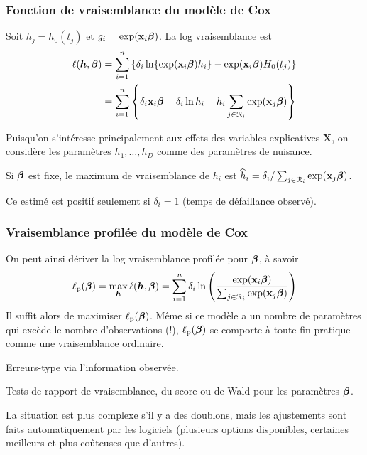 \documentclass{beamer}
\begin{document}
\begin{frame}
 \frametitle{Fonction de vraisemblance du modèle de Cox}
 Soit $h_j = h_0(t_j)$ et $g_i=\exp(\mathbf{x}_i \boldsymbol {\beta})$. La log vraisemblance est
 \begin{align*}
  \ell(\boldsymbol {h}, \boldsymbol {\beta}) &= \sum_{i=1}^n \left\{ \delta_i \ln \{\exp(\mathbf{x}_i \boldsymbol {\beta})h_i\}-\exp(\mathbf{x}_i \boldsymbol {\beta})H_0(t_j)\right\} 
  \\& =  \sum_{i=1}^n \left\{ \delta_i \mathbf{x}_i \boldsymbol {\beta} + \delta_i \ln h_i -h_i \sum_{j \in \mathcal{R}_i}\exp(\mathbf{x}_j \boldsymbol {\beta})\right\} 
 \end{align*}
\bi 
\item Puisqu'on s'intéresse principalement aux effets des variables explicatives $\mathbf{X}$, on considère les paramètres $h_1,\ldots, h_D$ comme des paramètres de nuisance.
\item Si $\boldsymbol {\beta}$ est fixe, le maximum de vraisemblance de $h_i$ est $\widehat{h}_i = \delta_i/\sum_{j \in \mathcal{R}_i} \exp(\mathbf{x}_j \boldsymbol {\beta})$.
\item Ce estimé est positif seulement si $\delta_i=1$ (temps de défaillance observé).
\ei 
\end{frame}
\begin{frame}
 \frametitle{Vraisemblance profilée du modèle de Cox}
 On peut ainsi dériver la log vraisemblance profilée pour $\boldsymbol {\beta}$, à savoir
 \begin{align*}
  \ell_{\mathrm{p}}(\boldsymbol {\beta}) = \max_{\boldsymbol {h}}  \ell(\boldsymbol {h}, \boldsymbol {\beta})  = \sum_{i=1}^n \delta_i \ln \left( \frac{\exp(\mathbf{x}_i\boldsymbol {\beta})}{\sum_{j \in \mathcal{R}_i}\exp(\mathbf{x}_j\boldsymbol {\beta})}\right)
 \end{align*}
 Il suffit alors de maximiser $\ell_{\mathrm{p}}(\boldsymbol {\beta})$. 
Même si ce modèle a un nombre de paramètres qui excède le nombre d'observations (!), $\ell_{\mathrm{p}}(\boldsymbol {\beta})$ se comporte à toute fin pratique comme une vraisemblance ordinaire. 
 \bi \item Erreurs-type via l'information observée.
 \item Tests de rapport de vraisemblance, du score ou de Wald pour les paramètres $\boldsymbol {\beta}$.
 \ei 
 \vp\vp
 
 {\footnotesize 
La situation est plus complexe s'il y a des doublons, mais les ajustements sont faits automatiquement par les logiciels (plusieurs options disponibles, certaines meilleurs et plus coûteuses que d'autres).


}
\end{frame}
\end{document}
